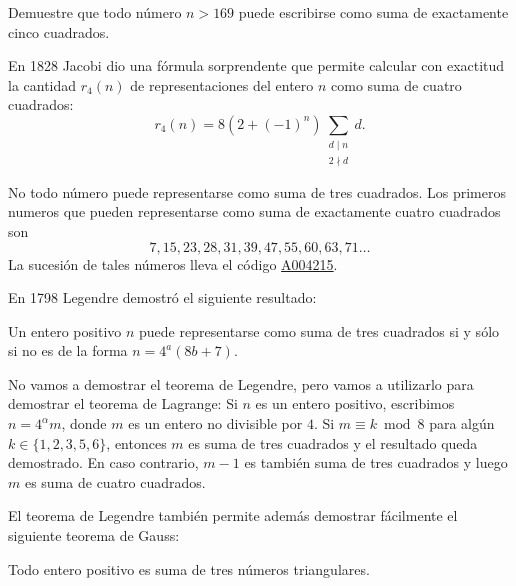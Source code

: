 \begin{exercise}
	Demuestre que todo número $n>169$ puede escribirse como suma de exactamente
	cinco cuadrados.
\end{exercise}

En 1828 Jacobi dio una fórmula sorprendente que permite calcular con exactitud
la cantidad $r_{4}(n)$ de representaciones del entero $n$ como suma de cuatro
cuadrados:
\[
	r_{4}(n)=8(2+(-1)^n)\sum_{\substack{d\mid n\\2\nmid d}}d.
\]

No todo número puede representarse como suma de tres cuadrados.  Los primeros
numeros que pueden representarse como suma de exactamente cuatro cuadrados son 
\[
	7, 15, 23, 28, 31, 39, 47, 55, 60, 63, 71\dots
\]
La sucesión de tales números lleva el código \href{https://oeis.org/A004215}{A004215}.

En 1798 Legendre demostró el siguiente resultado:

\begin{theorem}[Legendre]
Un entero positivo $n$ puede representarse como suma de tres
cuadrados si y sólo si no es de la forma $n=4^a(8b+7)$. 
\end{theorem}

No vamos a demostrar el teorema de Legendre, pero vamos a utilizarlo 
para demostrar el teorema de Lagrange: Si $n$ es un
entero positivo, escribimos $n=4^{\alpha}m$, donde $m$ es un entero no
divisible por $4$. Si $m\equiv k\bmod 8$ para algún $k\in\{1,2,3,5,6\}$,
entonces $m$ es suma de tres cuadrados y el resultado queda demostrado. En caso
contrario, $m-1$ es también suma de tres cuadrados y luego $m$ es suma de
cuatro cuadrados. 




El teorema de Legendre también permite además demostrar fácilmente el siguiente
teorema de Gauss:

\begin{theorem}[Gauss]
	Todo entero positivo es suma de tres números triangulares.
\end{theorem}

